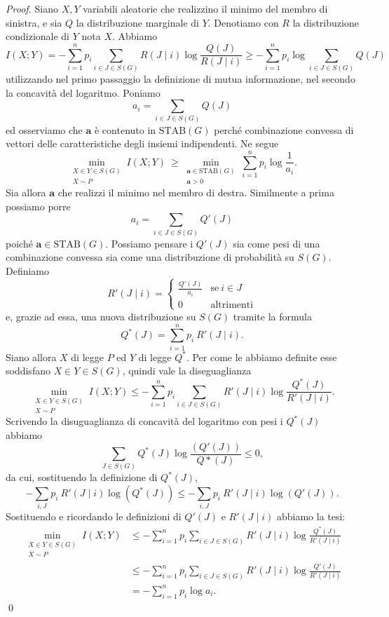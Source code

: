 \begin{proof}
  Siano \(X,Y\) variabili aleatorie che realizzino il minimo del membro di sinistra, e sia \(Q\) la distribuzione marginale di \(Y\). Denotiamo con \(R\) la distribuzione condizionale di \(Y\) nota \(X\). Abbiamo
  \[I(X;Y)=-\sum_{i=1}^n p_i\sum_{i\in J\in S(G)} R(J\mid i)\log{\frac{Q(J)}{R(J\mid i)}}\ge -\sum_{i=1}^n p_i \log{\sum_{i\in J\in S(G)}} Q(J)\]
  utilizzando nel primo passaggio la definizione di mutua informazione, nel secondo la concavità del logaritmo. Poniamo
  \[a_i=\sum_{i\in J\in S(G)} Q(J)\]
  ed osserviamo che \(\mathbf{a}\) è contenuto in \(\text{STAB}(G)\) perché combinazione convessa di vettori delle caratteristiche degli insiemi indipendenti. Ne segue
  \[\min_{\substack{X\in Y\in S(G) \\
      X\sim P}} I(X;Y)\ \ge \min_{\substack{\mathbf{a}\in \text{STAB}(G) \\
      \mathbf{a}>0}} \sum_{i=1}^n p_i\log{\frac{1}{a_i}}.\]
  Sia allora \(\mathbf{a}\) che realizzi il minimo nel membro di destra. Similmente a prima possiamo porre
  \[a_i=\sum_{i\in J\in S(G)} Q'(J)\]
  poiché \(\mathbf{a}\in \text{STAB}(G)\). Possiamo pensare i \(Q'(J)\) sia come pesi di una combinazione convessa sia come una distribuzione di probabilità su \(S(G)\). Definiamo
  \[R'(J\mid i)= 
  \begin{cases}
    \frac{Q'(J)}{a_i} & \text{se}\ i\in J\\
    0 & \text{altrimenti} 
  \end{cases}
  \]
  e, grazie ad essa, una nuova distribuzione su \(S(G)\) tramite la formula
  \[Q^*(J)=\sum_{i=1}^n p_i\ R'(J\mid i).\]
  Siano allora \(X\) di legge \(P\) ed \(Y\) di legge \(Q^*\). Per come le abbiamo definite esse soddisfano \(X\in Y\in S(G)\), quindi vale la diseguaglianza
  \[\min_{\substack{X\in Y\in S(G) \\
      X\sim P}} I(X;Y)\le -\sum_{i=1}^n p_i\sum_{i\in J\in S(G)} R'(J\mid i)\log{\frac{Q^*(J)}{R'(J\mid i)}}.\]
  Scrivendo la disuguaglianza di concavità del logaritmo con pesi i \(Q^*(J)\) abbiamo
  \[\sum_{J\in S(G)} Q^*(J)\log{\frac{(Q'(J))}{Q*(J)}} \le 0,\]
  da cui, sostituendo la definizione di \(Q^*(J)\),
  \[-\sum_{i,J} p_i\ R'(J\mid i)\log(Q^*(J))\le -\sum_{i,J} p_i\ R'(J\mid i)\log(Q'(J)).\]
  Sostituendo e ricordando le definizioni di \(Q'(J)\) e \(R'(J\mid i)\) abbiamo la tesi: 
  \begin{align}
    \min_{\substack{X\in Y\in S(G) \\
	X\sim P}} I(X;Y)&\le -\sum_{i=1}^n p_i\sum_{i\in J\in S(G)} R'(J\mid i)\log{\frac{Q^*(J)}{R'(J\mid i)}} \nonumber \\
    &\le -\sum_{i=1}^n p_i\sum_{i\in J\in S(G)} R'(J\mid i)\log{\frac{Q'(J)}{R'(J\mid i)}} \nonumber \\
    &= -\sum_{i=1}^n p_i\log{a_i}\text{.} \nonumber 
  \end{align}
  \qed 
\end{proof}
